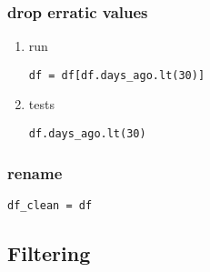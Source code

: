 \documentclass[11pt]{article}
\begin{document}
\subsubsection{drop erratic values}
\label{sec:orgb817458}
\begin{enumerate}
\item run
\label{sec:org055cea9}
\begin{verbatim}
df = df[df.days_ago.lt(30)]
\end{verbatim}
\item tests
\label{sec:org1a8085d}
\begin{verbatim}
df.days_ago.lt(30)
\end{verbatim}
\end{enumerate}
\subsubsection{rename}
\label{sec:org85be0fa}
\begin{verbatim}
df_clean = df
\end{verbatim}

\subsection{Filtering}
\label{sec:orgfcffccc}
\end{document}
